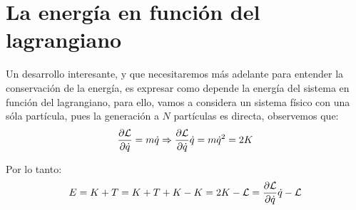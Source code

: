 \section{La energía en función del lagrangiano}\label{sec:la-energia-en-funcion-del-lagrangiano}

Un desarrollo interesante, y que necesitaremos más adelante para entender la conservación de la energía, es expresar como depende la energía del sistema en función del lagrangiano, para ello, vamos a considera un sistema físico con una sóla partícula, pues la generación a $N$ partículas es directa, observemos que:
\begin{equation*}
	\frac{\partial\mathcal{L}}{\partial\dot{q}} =m\dot{q}\Rightarrow \frac{\partial\mathcal{L}}{\partial\dot{q}}\dot{q} =m\dot{q}^2 = 2K
\end{equation*}

Por lo tanto:
\begin{equation}
	\label{eq:energia-lagrangiana}
	E=K+T=K+T+K-K=2K-\mathcal{L}=\frac{\partial\mathcal{L}}{\partial\dot{q}}\dot{q}-\mathcal{L}
\end{equation}

